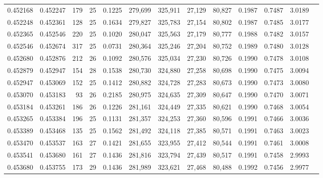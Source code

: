 \begin{tabular}{rrrrrrrrrrrrr}
0.452168 & 0.452247 & 179 &  25 &                                     0.1225 & 279,699 & 325,911 &  27,129 &  80,827 & 0.1987 & 0.7487 & 3.0189 \\
0.452248 & 0.452361 & 128 &  25 &                                     0.1634 & 279,827 & 325,783 &  27,154 &  80,802 & 0.1987 & 0.7485 & 3.0177 \\
0.452365 & 0.452546 & 220 &  25 &                                     0.1020 & 280,047 & 325,563 &  27,179 &  80,777 & 0.1988 & 0.7482 & 3.0157 \\
0.452546 & 0.452674 & 317 &  25 &                                     0.0731 & 280,364 & 325,246 &  27,204 &  80,752 & 0.1989 & 0.7480 & 3.0128 \\
0.452680 & 0.452876 & 212 &  26 &                                     0.1092 & 280,576 & 325,034 &  27,230 &  80,726 & 0.1990 & 0.7478 & 3.0108 \\
0.452879 & 0.452947 & 154 &  28 &                                     0.1538 & 280,730 & 324,880 &  27,258 &  80,698 & 0.1990 & 0.7475 & 3.0094 \\
0.452947 & 0.453069 & 152 &  25 &                                     0.1412 & 280,882 & 324,728 &  27,283 &  80,673 & 0.1990 & 0.7473 & 3.0080 \\
0.453070 & 0.453183 &  93 &  26 &                                     0.2185 & 280,975 & 324,635 &  27,309 &  80,647 & 0.1990 & 0.7470 & 3.0071 \\
0.453184 & 0.453261 & 186 &  26 &                                     0.1226 & 281,161 & 324,449 &  27,335 &  80,621 & 0.1990 & 0.7468 & 3.0054 \\
0.453265 & 0.453384 & 196 &  25 &                                     0.1131 & 281,357 & 324,253 &  27,360 &  80,596 & 0.1991 & 0.7466 & 3.0036 \\
0.453389 & 0.453468 & 135 &  25 &                                     0.1562 & 281,492 & 324,118 &  27,385 &  80,571 & 0.1991 & 0.7463 & 3.0023 \\
0.453470 & 0.453537 & 163 &  27 &                                     0.1421 & 281,655 & 323,955 &  27,412 &  80,544 & 0.1991 & 0.7461 & 3.0008 \\
0.453541 & 0.453680 & 161 &  27 &                                     0.1436 & 281,816 & 323,794 &  27,439 &  80,517 & 0.1991 & 0.7458 & 2.9993 \\
0.453680 & 0.453755 & 173 &  29 &                                     0.1436 & 281,989 & 323,621 &  27,468 &  80,488 & 0.1992 & 0.7456 & 2.9977 \\

\end{tabular}
